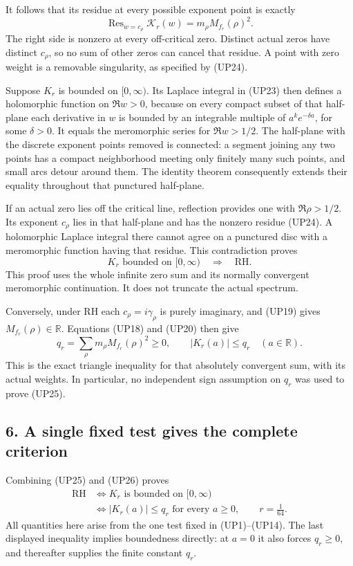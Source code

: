 \documentclass[
  10pt,
  a4paper,
]{article}
\begin{document}
It follows that its residue at every possible exponent point is exactly
\[
\operatorname{Res}_{w=c_\rho}\mathscr K_r(w)
=m_\rho M_{f_r}(\rho)^2.
\tag{UP24}
\] The right side is nonzero at every off-critical zero. Distinct actual
zeros have distinct \(c_\rho\), so no sum of other zeros can cancel that
residue. A point with zero weight is a removable singularity, as
specified by (UP24).

Suppose \(K_r\) is bounded on \([0,\infty)\). Its Laplace integral in
(UP23) then defines a holomorphic function on \(\Re w>0\), because on
every compact subset of that half-plane each derivative in \(w\) is
bounded by an integrable multiple of \(a^ke^{-\delta a}\), for some
\(\delta>0\). It equals the meromorphic series for \(\Re w>1/2\). The
half-plane with the discrete exponent points removed is connected: a
segment joining any two points has a compact neighborhood meeting only
finitely many such points, and small arcs detour around them. The
identity theorem consequently extends their equality throughout that
punctured half-plane.

If an actual zero lies off the critical line, reflection provides one
with \(\Re\rho>1/2\). Its exponent \(c_\rho\) lies in that half-plane
and has the nonzero residue (UP24). A holomorphic Laplace integral there
cannot agree on a punctured disc with a meromorphic function having that
residue. This contradiction proves \[
K_r\text{ bounded on }[0,\infty)
\quad\Longrightarrow\quad\mathrm{RH}.
\tag{UP25}
\] This proof uses the whole infinite zero sum and its normally
convergent meromorphic continuation. It does not truncate the actual
spectrum.

Conversely, under RH each \(c_\rho=i\gamma_\rho\) is purely imaginary,
and (UP19) gives \(M_{f_r}(\rho)\in\mathbb R\). Equations (UP18) and
(UP20) then give \[
q_r=\sum_\rho m_\rho M_{f_r}(\rho)^2\ge0,
\qquad |K_r(a)|\le q_r\quad(a\in\mathbb R).
\tag{UP26}
\] This is the exact triangle inequality for that absolutely convergent
sum, with its actual weights. In particular, no independent sign
assumption on \(q_r\) was used to prove (UP25).

\subsection{6. A single fixed test gives the complete
criterion}\label{a-single-fixed-test-gives-the-complete-criterion}

Combining (UP25) and (UP26) proves \[
\boxed{
\begin{aligned}
\mathrm{RH}
&\Longleftrightarrow K_r\text{ is bounded on }[0,\infty)\\
&\Longleftrightarrow |K_r(a)|\le q_r\text{ for every }a\ge0,
\qquad r=\frac1{64}.
\end{aligned}}
\tag{UP27}
\] All quantities here arise from the one test fixed in (UP1)--(UP14).
The last displayed inequality implies boundedness directly: at \(a=0\)
it also forces \(q_r\ge0\), and thereafter supplies the finite constant
\(q_r\).
\end{document}
